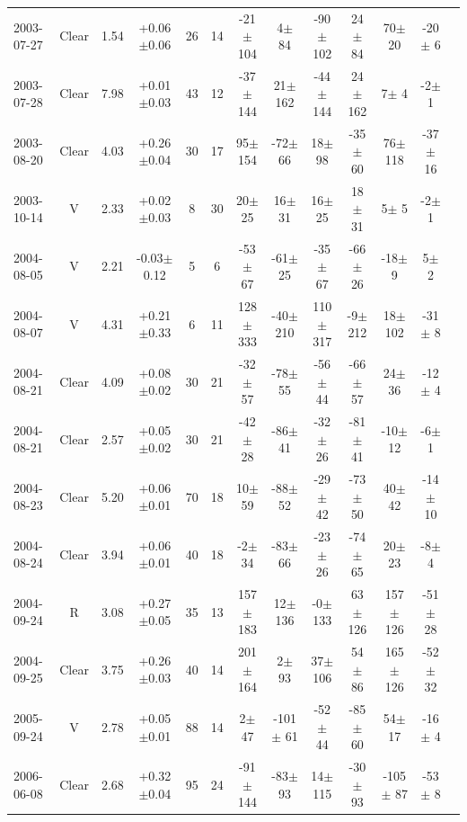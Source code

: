 \documentclass[12pt,a4paper]{report}
\begin{document}
\begin{landscape}
\begin{longtable}{|l|c|c|c|c|c|c|c|c|c|c|c|c|}
2003-07-27 & Clear & 1.54 & +0.06$\pm$0.06 &  26 &  14 &  -21$\pm$104 &    4$\pm$ 84 &  -90$\pm$102 &   24$\pm$ 84 &   70$\pm$ 20 &  -20$\pm$  6 \\ 
2003-07-28 & Clear & 7.98 & +0.01$\pm$0.03 &  43 &  12 &  -37$\pm$144 &   21$\pm$162 &  -44$\pm$144 &   24$\pm$162 &    7$\pm$  4 &   -2$\pm$  1 \\ 
2003-08-20 & Clear & 4.03 & +0.26$\pm$0.04 &  30 &  17 &   95$\pm$154 &  -72$\pm$ 66 &   18$\pm$ 98 &  -35$\pm$ 60 &   76$\pm$118 &  -37$\pm$ 16 \\ 
2003-10-14 & V     & 2.33 & +0.02$\pm$0.03 &   8 &  30 &   20$\pm$ 25 &   16$\pm$ 31 &   16$\pm$ 25 &   18$\pm$ 31 &    5$\pm$  5 &   -2$\pm$  1 \\ 
2004-08-05 & V     & 2.21 & -0.03$\pm$0.12 &   5 &   6 &  -53$\pm$ 67 &  -61$\pm$ 25 &  -35$\pm$ 67 &  -66$\pm$ 26 &  -18$\pm$  9 &    5$\pm$  2 \\ 
2004-08-07 & V     & 4.31 & +0.21$\pm$0.33 &   6 &  11 &  128$\pm$333 &  -40$\pm$210 &  110$\pm$317 &   -9$\pm$212 &   18$\pm$102 &  -31$\pm$  8 \\ 
2004-08-21 & Clear & 4.09 & +0.08$\pm$0.02 &  30 &  21 &  -32$\pm$ 57 &  -78$\pm$ 55 &  -56$\pm$ 44 &  -66$\pm$ 57 &   24$\pm$ 36 &  -12$\pm$  4 \\ 
2004-08-21 & Clear & 2.57 & +0.05$\pm$0.02 &  30 &  21 &  -42$\pm$ 28 &  -86$\pm$ 41 &  -32$\pm$ 26 &  -81$\pm$ 41 &  -10$\pm$ 12 &   -6$\pm$  1 \\ 
2004-08-23 & Clear & 5.20 & +0.06$\pm$0.01 &  70 &  18 &   10$\pm$ 59 &  -88$\pm$ 52 &  -29$\pm$ 42 &  -73$\pm$ 50 &   40$\pm$ 42 &  -14$\pm$ 10 \\ 
2004-08-24 & Clear & 3.94 & +0.06$\pm$0.01 &  40 &  18 &   -2$\pm$ 34 &  -83$\pm$ 66 &  -23$\pm$ 26 &  -74$\pm$ 65 &   20$\pm$ 23 &   -8$\pm$  4 \\ 
2004-09-24 & R     & 3.08 & +0.27$\pm$0.05 &  35 &  13 &  157$\pm$183 &   12$\pm$136 &   -0$\pm$133 &   63$\pm$126 &  157$\pm$126 &  -51$\pm$ 28 \\ 
2004-09-25 & Clear & 3.75 & +0.26$\pm$0.03 &  40 &  14 &  201$\pm$164 &    2$\pm$ 93 &   37$\pm$106 &   54$\pm$ 86 &  165$\pm$126 &  -52$\pm$ 32 \\ 
2005-09-24 & V     & 2.78 & +0.05$\pm$0.01 &  88 &  14 &    2$\pm$ 47 & -101$\pm$ 61 &  -52$\pm$ 44 &  -85$\pm$ 60 &   54$\pm$ 17 &  -16$\pm$  4 \\ 
2006-06-08 & Clear & 2.68 & +0.32$\pm$0.04 &  95 &  24 &  -91$\pm$144 &  -83$\pm$ 93 &   14$\pm$115 &  -30$\pm$ 93 & -105$\pm$ 87 &  -53$\pm$  8 \\ 

\end{longtable}
\end{landscape}
\end{document}
